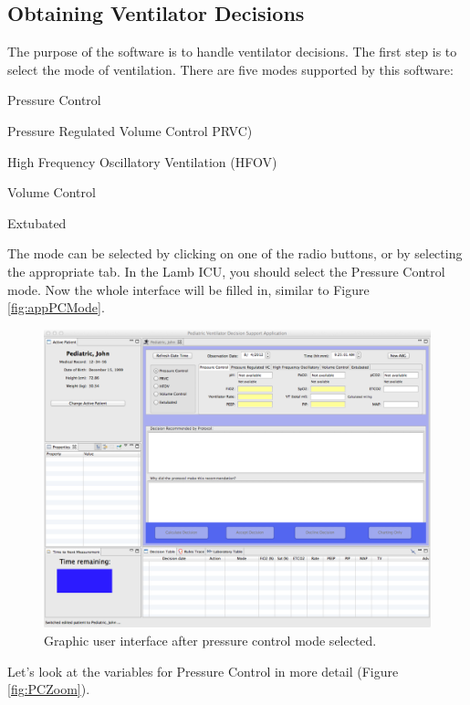 \subsection{Obtaining Ventilator Decisions}
The purpose of the software is to handle ventilator decisions.  The first step is to select the mode of ventilation.  There
are five modes supported by this software:\\

\begin{compactitem}
\item
Pressure Control
\item
Pressure Regulated Volume Control PRVC)
\item
High Frequency Oscillatory Ventilation (HFOV)
\item
Volume Control
\item
Extubated
\end{compactitem}

The mode can be selected by clicking on one of the radio buttons, or by selecting
the appropriate tab.  In the Lamb ICU, you should select the Pressure Control mode.  Now the whole interface will be
filled in, similar to Figure \vref{fig:appPCMode}.\\


\begin{figure}[htbp] 
   \centering
   \includegraphics[width=\textwidth]{WholeAppPCMode} 
   \caption{Graphic user interface after pressure control mode selected.}
   \label{fig:appPCMode}
\end{figure}

Let's look at the variables for Pressure Control in more detail (Figure \vref{fig:PCZoom}).\\

